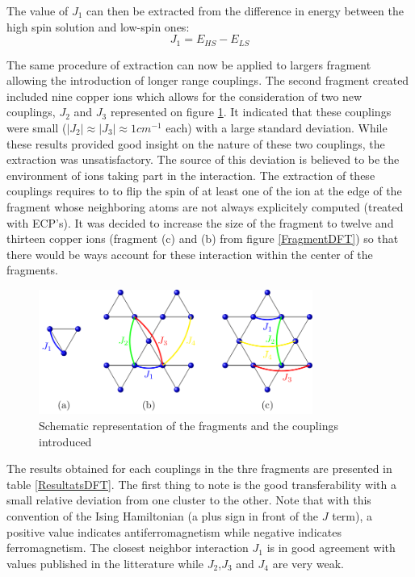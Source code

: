 \documentclass[10pt]{report}
\numberwithin{equation}{section}
\begin{document}
The value of $J_1$ can then be extracted from the difference in energy between the high spin solution and low-spin ones:
\begin{equation}
    J_1=E_{HS}-E_{LS}
\end{equation}

The same procedure of extraction can now be applied to largers fragment allowing the introduction of longer range couplings.
The second fragment created included nine copper ions which allows for the consideration of two new couplings, $J_2$ and $J_3$ represented on figure \ref{CouplageDFT}.
It indicated that these couplings were small ($|J_{2}|\approx |J_{3}|\approx1 cm^{-1}$ each) with a large standard deviation.
While these results provided good insight on the nature of these two couplings, the extraction was unsatisfactory.
The source of this deviation is believed to be the environment of ions taking part in the interaction. 
The extraction of these couplings requires to to flip the spin of at least one of the ion at the edge of the fragment whose neighboring atoms are not always explicitely computed (treated with ECP's).
It was decided to increase the size of the fragment to twelve and thirteen copper ions (fragment (c) and (b) from figure \ref{FragmentDFT}) so that there would be ways account for these interaction within the center of the fragments.


\begin{figure}[h!]
    \centering
    \includegraphics[width=0.8\textwidth]{Images/ModeleDFT_plan.png}
    \caption{Schematic representation of the fragments and the couplings introduced}
    \label{CouplageDFT}
\end{figure}

The results obtained for each couplings in the thre fragments are presented in table \ref{ResultatsDFT}.
The first thing to note is the good transferability with a small relative deviation from one cluster to the other.
Note that with this convention of the Ising Hamiltonian (a plus sign in front of the $J$ term), a positive value indicates antiferromagnetism while negative indicates ferromagnetism.
The closest neighbor interaction $J_1$ is in good agreement with values published in the litterature while $J_2$,$J_3$ and $J_4$ are very weak. 
\end{document}
